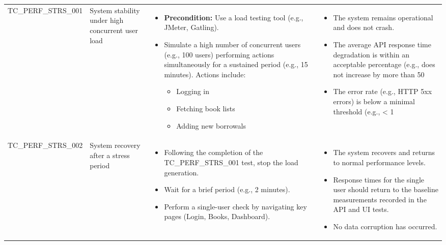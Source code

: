 \documentclass[10pt, a4paper]{report}
\begin{document}
\begin{longtable}{|>{\raggedright\arraybackslash}p{3.5cm}|>{\raggedright\arraybackslash}p{4cm}|>{\raggedright\arraybackslash}p{5cm}|>{\raggedright\arraybackslash}p{5.5cm}|}
\multicolumn{4}{|l|}{\textbf{Sub-Section: Stress Testing}} \\ \hline
TC\_PERF\_STRS\_001 & System stability under high concurrent user load & 
    \begin{itemize}[noitemsep, topsep=0pt, partopsep=0pt, leftmargin=*]
        \item \textbf{Precondition:} Use a load testing tool (e.g., JMeter, Gatling).
        \item Simulate a high number of concurrent users (e.g., 100 users) performing actions simultaneously for a sustained period (e.g., 15 minutes). Actions include:
        \begin{itemize}
            \item Logging in
            \item Fetching book lists
            \item Adding new borrowals
        \end{itemize}
    \end{itemize} & 
    \begin{itemize}[noitemsep, topsep=0pt, partopsep=0pt, leftmargin=*]
        \item The system remains operational and does not crash.
        \item The average API response time degradation is within an acceptable percentage (e.g., does not increase by more than 50%
        \item The error rate (e.g., HTTP 5xx errors) is below a minimal threshold (e.g., < 1%
    \end{itemize} \\ \hline
TC\_PERF\_STRS\_002 & System recovery after a stress period & 
    \begin{itemize}[noitemsep, topsep=0pt, partopsep=0pt, leftmargin=*]
        \item Following the completion of the TC\_PERF\_STRS\_001 test, stop the load generation.
        \item Wait for a brief period (e.g., 2 minutes).
        \item Perform a single-user check by navigating key pages (Login, Books, Dashboard).
    \end{itemize} & 
    \begin{itemize}[noitemsep, topsep=0pt, partopsep=0pt, leftmargin=*]
        \item The system recovers and returns to normal performance levels.
        \item Response times for the single user should return to the baseline measurements recorded in the API and UI tests.
        \item No data corruption has occurred.
    \end{itemize} \\ \hline

\end{longtable}
\end{document}
